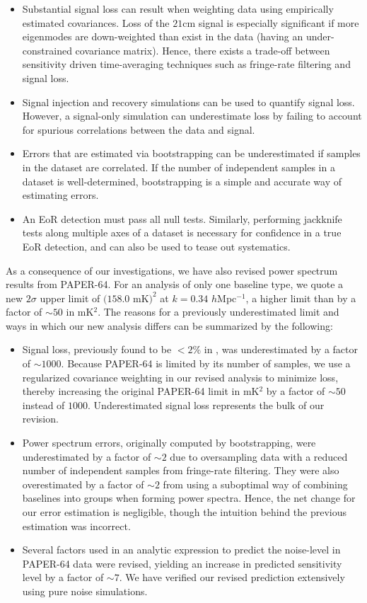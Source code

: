 \documentclass[preprint2,numberedappendix,tighten]{aastex6}  %
\begin{document}
\begin{itemize}
\item Substantial signal loss can result when weighting data using empirically estimated covariances. Loss of the $21$cm signal is especially significant if more eigenmodes are down-weighted than exist in the data (having an under-constrained covariance matrix). Hence, there exists a trade-off between sensitivity driven time-averaging techniques such as fringe-rate filtering and signal loss. 
\item Signal injection and recovery simulations can be used to quantify signal loss. However, a signal-only simulation can underestimate loss by failing to account for spurious correlations between the data and signal. 
\item Errors that are estimated via bootstrapping can be underestimated if samples in the dataset are correlated. If the number of independent samples in a dataset is well-determined, bootstrapping is a simple and accurate way of estimating errors.
\item An EoR detection must pass all null tests. Similarly, performing jackknife tests along multiple axes of a dataset is necessary for confidence in a true EoR detection, and can also be used to tease out systematics.
\end{itemize}

As a consequence of our investigations, we have also revised power spectrum results from PAPER-64. For an analysis of only one baseline type, we quote a new $2\sigma$ upper limit of $(158.0$ mK$)^{2}$ at $k=0.34$ $h$Mpc$^{-1}$, a higher limit than \citet{ali_et_al2015} by a factor of $\sim50$ in mK$^{2}$. The reasons for a previously underestimated limit and ways in which our new analysis differs can be summarized by the following:

\begin{itemize}
\item Signal loss, previously found to be $<2\%$ in \citet{ali_et_al2015}, was underestimated by a factor of $\sim$$1000$. Because PAPER-64 is limited by its number of samples, we use a regularized covariance weighting in our revised analysis to minimize loss, thereby increasing the original PAPER-64 limit in mK$^{2}$ by a factor of $\sim$$50$ instead of $1000$. Underestimated signal loss represents the bulk of our revision.
\item Power spectrum errors, originally computed by bootstrapping, were underestimated by a factor of $\sim$$2$ due to oversampling data with a reduced number of independent samples from fringe-rate filtering. They were also overestimated by a factor of $\sim$$2$ from using a suboptimal way of combining baselines into groups when forming power spectra. Hence, the net change for our error estimation is negligible, though the intuition behind the previous estimation was incorrect.
\item Several factors used in an analytic expression to predict the noise-level in PAPER-64 data were revised, yielding an increase in predicted sensitivity level by a factor of $\sim$$7$. We have verified our revised prediction extensively using pure noise simulations.
\end{itemize}
\end{document}
